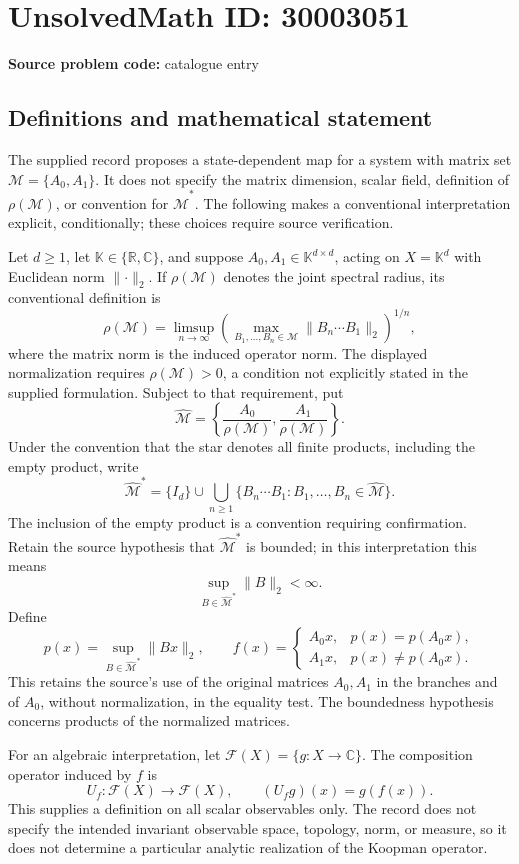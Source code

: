 \documentclass[11pt]{article}
\newcommand{\R}{\mathbb{R}}
\newcommand{\C}{\mathbb{C}}
\begin{document}
\section*{UnsolvedMath ID: 30003051}
\textbf{Source problem code:} catalogue entry
\subsection{Definitions and mathematical statement}
The supplied record proposes a state-dependent map for a system with matrix set \(\mathcal M=\{A_0,A_1\}\). It does not specify the matrix dimension, scalar field, definition of \(\rho(\mathcal M)\), or convention for \(\widehat{\mathcal M}^{*}\). The following makes a conventional interpretation explicit, conditionally; these choices require source verification.

Let \(d\geq 1\), let \(\mathbb K\in\{\R,\C\}\), and suppose \(A_0,A_1\in\mathbb K^{d\times d}\), acting on \(X=\mathbb K^d\) with Euclidean norm \(\lVert\cdot\rVert_2\). If \(\rho(\mathcal M)\) denotes the joint spectral radius, its conventional definition is
\[
\rho(\mathcal M)=\limsup_{n\to\infty}\left(\max_{B_1,\ldots,B_n\in\mathcal M}\lVert B_n\cdots B_1\rVert_2\right)^{1/n},
\]
where the matrix norm is the induced operator norm. The displayed normalization requires \(\rho(\mathcal M)>0\), a condition not explicitly stated in the supplied formulation. Subject to that requirement, put
\[
\widehat{\mathcal M}=\left\{\frac{A_0}{\rho(\mathcal M)},\frac{A_1}{\rho(\mathcal M)}\right\}.
\]
Under the convention that the star denotes all finite products, including the empty product, write
\[
\widehat{\mathcal M}^{*}=\{I_d\}\cup\bigcup_{n\geq1}\{B_n\cdots B_1:B_1,\ldots,B_n\in\widehat{\mathcal M}\}.
\]
The inclusion of the empty product is a convention requiring confirmation. Retain the source hypothesis that \(\widehat{\mathcal M}^{*}\) is bounded; in this interpretation this means
\[
\sup_{B\in\widehat{\mathcal M}^{*}}\lVert B\rVert_2<\infty.
\]
Define
\[
p(x)=\sup_{B\in\widehat{\mathcal M}^{*}}\lVert Bx\rVert_2,
\qquad
f(x)=\begin{cases}
A_0x,&p(x)=p(A_0x),\\
A_1x,&p(x)\ne p(A_0x).
\end{cases}
\]
This retains the source's use of the original matrices \(A_0,A_1\) in the branches and of \(A_0\), without normalization, in the equality test. The boundedness hypothesis concerns products of the normalized matrices.

For an algebraic interpretation, let \(\mathcal F(X)=\{g:X\to\C\}\). The composition operator induced by \(f\) is
\[
U_f:\mathcal F(X)\to\mathcal F(X),\qquad (U_fg)(x)=g(f(x)).
\]
This supplies a definition on all scalar observables only. The record does not specify the intended invariant observable space, topology, norm, or measure, so it does not determine a particular analytic realization of the Koopman operator.
\end{document}
